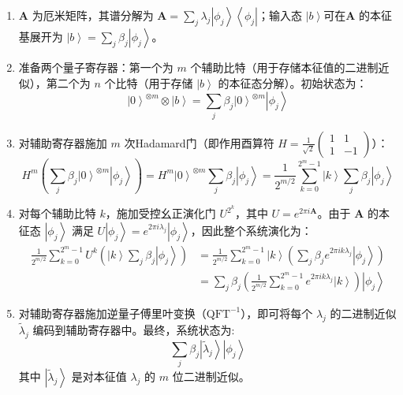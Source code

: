 \documentclass[12pt, a4paper]{article}
\newcommand{\ket}[1]{\left| #1 \right\rangle}   %
\newcommand{\bra}[1]{\left\langle #1 \right|}   %
\newcommand{\mat}[1]{\mathbf{#1}}               %
\begin{document}
\begin{enumerate}
    \item $\mat{A}$ 为厄米矩阵，其谱分解为 $\mat{A} = \sum_j \lambda_j \ket{\phi_j} \bra{\phi_j}$；输入态 $\ket{b}$可在$\mat{A}$ 的本征基展开为 $\ket{b} = \sum_j \beta_j \ket{\phi_j}$。

    \item 准备两个量子寄存器：第一个为 $m$ 个辅助比特（用于存储本征值的二进制近似），第二个为 $n$ 个比特（用于存储 $\ket{b}$ 的本征态分解）。初始状态为：
    \begin{equation*}
        \ket{0}^{\otimes m} \otimes \ket{b} = \sum_j \beta_j \ket{0}^{\otimes m} \ket{\phi_j}
    \end{equation*}

    \item 对辅助寄存器施加 $m$ 次Hadamard门（即作用酉算符 $H = \frac{1}{\sqrt{2}}\begin{pmatrix} 1 & 1 \\ 1 & -1 \end{pmatrix}$）：
    \begin{equation*}
        H^{m} \left(\sum_j \beta_j \ket{0}^{\otimes m} \ket{\phi_j}\right) = H^{m} \ket{0}^{\otimes m} \sum_j \beta_j \ket{\phi_j} = \frac{1}{2^{m/2}} \sum_{k=0}^{2^m-1} \ket{k} \sum_j \beta_j \ket{\phi_j}
    \end{equation*}

    \item 对每个辅助比特 $k$，施加受控幺正演化门 $U^{2^k}$，其中 $U = e^{2\pi i \mat{A}}$。由于 $\mat{A}$ 的本征态 $\ket{\phi_j}$ 满足 $U \ket{\phi_j} = e^{2\pi i \lambda_j} \ket{\phi_j}$，因此整个系统演化为：
    \begin{align*}
        \frac{1}{2^{m/2}} \sum_{k=0}^{2^m-1} U^{k} \left(\ket{k} \sum_j \beta_j \ket{\phi_j}\right)
        &= \frac{1}{2^{m/2}} \sum_{k=0}^{2^m-1} \ket{k} \left( \sum_j \beta_j e^{2\pi i k \lambda_j} \ket{\phi_j} \right) \\
        &= \sum_j \beta_j \left(\frac{1}{2^{m/2}} \sum_{k=0}^{2^m-1} e^{2\pi i k \lambda_j} \ket{k}\right) \ket{\phi_j}
    \end{align*}

    \item 对辅助寄存器施加逆量子傅里叶变换（$\text{QFT}^{-1}$），即可将每个 $\lambda_j$ 的二进制近似 $\tilde{\lambda}_j$ 编码到辅助寄存器中。最终，系统状态为:
    \begin{equation*}
        \sum_j \beta_j \ket{\tilde{\lambda}_j} \ket{\phi_j}
    \end{equation*}
    其中 $\ket{\tilde{\lambda}_j}$ 是对本征值 $\lambda_j$ 的 $m$ 位二进制近似。
\end{enumerate}
\end{document}
